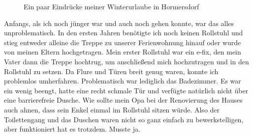 \documentclass[fontsize=14pt,a4paper,headinclude,DIV=calc,automark]{scrbook}
\begin{document}
\setlength{\fboxsep}{0pt}    %
\setlength{\fboxrule}{0.2pt} %
\begin{figure}[H]
    \raggedright
    \caption{Ein paar Eindrücke meiner Winterurlaube in Hormersdorf}
    \label{fig:hormersdorfcollection}
\end{figure}

Anfangs, als ich noch jünger war und auch noch gehen konnte, war das alles unproblematisch. In den ersten Jahren benötigte ich noch keinen Rollstuhl und stieg entweder alleine die Treppe zu unserer Ferienwohnung hinauf oder wurde von meinen Eltern hochgetragen. Mein erster Rollstuhl war ein e-fix, den mein Vater dann die Treppe hochtrug, um anschließend mich hochzutragen und in den Rollstuhl zu setzen. Da Flure und Türen breit genug waren, konnte ich problemlos umherfahren. Problematisch war lediglich das Badezimmer. Es war ein wenig beengt, hatte eine recht schmale Tür und verfügte natürlich nicht über eine barrierefreie Dusche. Wie sollte mein Opa bei der Renovierung des Hauses auch ahnen, dass sein Enkel einmal im Rollstuhl sitzen würde. Also der Toilettengang und das Duschen waren nicht so ganz einfach zu bewerkstelligen, aber funktioniert hat es trotzdem. Musste ja.
\end{document}
